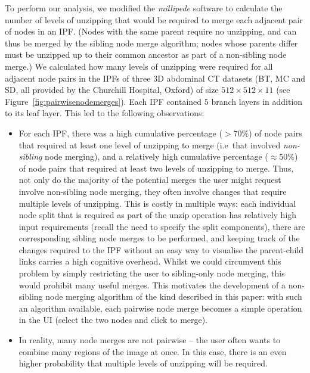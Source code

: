 \documentclass[10pt,twocolumn,twoside]{IEEEtran}
\begin{document}
To perform our analysis, we modified the \emph{millipede} software to calculate the number of levels of unzipping that would be required to merge each adjacent pair of nodes in an IPF. (Nodes with the same parent require no unzipping, and can thus be merged by the sibling node merge algorithm; nodes whose parents differ must be unzipped up to their common ancestor as part of a non-sibling node merge.) We calculated how many levels of unzipping were required for all adjacent node pairs in the IPFs of three 3D abdominal CT datasets (BT, MC and SD, all provided by the Churchill Hospital, Oxford) of size $512 \times 512 \times 11$ (see Figure~\ref{fig:pairwisenodemerges}). Each IPF contained $5$ branch layers in addition to its leaf layer. This led to the following observations:
%
\begin{itemize}
\item For each IPF, there was a high cumulative percentage ($> 70\%$) of node pairs that required at least one level of unzipping to merge (i.e~that involved \emph{non-sibling} node merging), and a relatively high cumulative percentage ($\approx 50\%$) of node pairs that required at least two levels of unzipping to merge. Thus, not only do the majority of the potential merges the user might request involve non-sibling node merging, they often involve changes that require multiple levels of unzipping. This is costly in multiple ways: each individual node split that is required as part of the unzip operation has relatively high input requirements (recall the need to specify the split components), there are corresponding sibling node merges to be performed, and keeping track of the changes required to the IPF without an easy way to visualise the parent-child links carries a high cognitive overhead. Whilst we could circumvent this problem by simply restricting the user to sibling-only node merging, this would prohibit many useful merges. This motivates the development of a non-sibling node merging algorithm of the kind described in this paper: with such an algorithm available, each pairwise node merge becomes a simple operation in the UI (select the two nodes and click to merge).

\item In reality, many node merges are not pairwise -- the user often wants to combine many regions of the image at once. In this case, there is an even higher probability that multiple levels of unzipping will be required.
\end{itemize}
%

\end{document}
